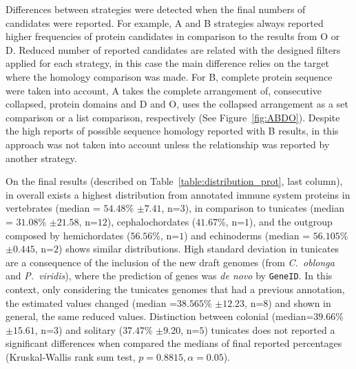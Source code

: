 \documentclass[11pt]{article}
\begin{document}
Differences between strategies were detected when the final numbers of candidates were
 reported. For example, A and B strategies always reported higher frequencies of 
protein candidates in comparison to the results from O or D. Reduced number of
reported candidates are related with the designed filters applied for each
strategy, in this case the main difference relies on the target where the
homology comparison was made. For B, complete protein sequence were taken into
account, A takes the complete arrangement of, consecutive collapsed, protein domains
and D and O, uses the collapsed arrangement as a set comparison or a 
list comparison, respectively (See Figure~\ref{fig:ABDO}). Despite the high reports of
possible sequence homology reported with B results, in this approach was not taken
into account unless the relationship was reported by another strategy.

On the final results (described on Table~\ref{table:distribution_prot}, last column),
in overall exists a highest distribution from annotated immune system proteins 
in vertebrates (median = $54.48$\% $\pm 7.41$, n=$3$), in comparison to tunicates 
(median = $31.08$\% $\pm 21.58$, n=$12$), cephalochordates ($41.67$\%, n=$1$), and 
the outgroup composed by hemichordates ($56.56$\%, n=$1$) and echinoderms (median = 
$56.105$\% $\pm 0.445$, n=$2$) shows similar distributions. High standard deviation in 
tunicates are a consequence of the inclusion of the new draft genomes 
(from \textit{C.\ oblonga} and \textit{P.\ viridis}), where the prediction of genes 
was \textsl{de novo} by \texttt{GeneID}. In this context, only considering the tunicates 
genomes that had a previous annotation, the estimated values changed 
(median =$38.565$\% $\pm 12.23$, n=$8$) and shown in general, the same reduced values. 
Distinction between colonial (median=$39.66$\% $\pm 15.61$, n=$3$) and 
solitary ($37.47$\% $\pm 9.20$, n=$5$) tunicates does not reported a significant differences
when compared the medians of final reported percentages (Kruskal-Wallis rank sum test,
$p=0.8815, \alpha=0.05$).
\end{document}
